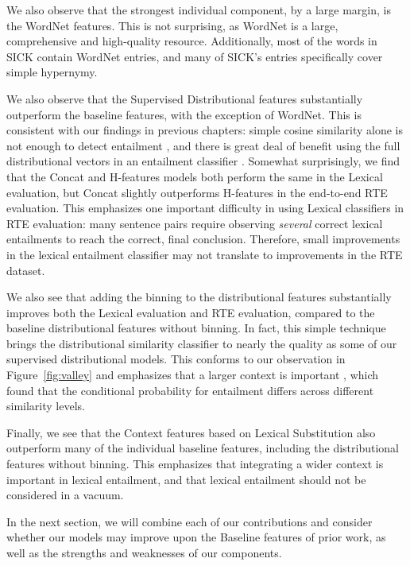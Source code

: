 We also observe that the strongest individual component, by a large margin, is
the WordNet features. This is not surprising, as WordNet is a large,
comprehensive and high-quality resource. Additionally, most of the words in SICK
contain WordNet entries, and many of SICK's entries specifically cover
simple hypernymy.

We also observe that the Supervised Distributional features substantially
outperform the baseline features, with the exception of WordNet. This is
consistent with our findings in previous chapters: simple cosine similarity
alone is not enough to detect entailment
\cite{weeds:2004:coling,baroni:2012:eacl,lenci:2012:starsem}, and there is
great deal of benefit using the full distributional vectors in an entailment
classifier
\cite{roller:2014:coling,kruszewski:2015:tacl,roller:2016:emnlp,shwartz:2016:acl}.
Somewhat surprisingly, we find that the Concat and H-features models both
perform the same in the Lexical evaluation, but Concat slightly outperforms
H-features in the end-to-end RTE evaluation. This emphasizes one important
difficulty in using Lexical classifiers in RTE evaluation: many sentence pairs
require observing {\em several} correct lexical entailments to reach the
correct, final conclusion. Therefore, small improvements in the lexical
entailment classifier may not translate to improvements in the RTE dataset.

We also see that adding the binning to the distributional features
substantially improves both the Lexical evaluation and RTE evaluation, compared
to the baseline distributional features without binning. In fact, this simple
technique brings the distributional similarity classifier to nearly the quality
as some of our supervised distributional models. This conforms to our
observation in Figure~\ref{fig:valley} and emphasizes that a larger context
is important , which found that the conditional
probability for entailment differs across different similarity levels.

Finally, we see that the Context features based on Lexical Substitution
also outperform many of the individual baseline features, including
the distributional features without binning. This emphasizes that integrating
a wider context is important in lexical entailment, and that lexical
entailment should not be considered in a vacuum.

In the next section, we will combine each of our contributions and consider
whether our models may improve upon the Baseline features of prior work,
as well as the strengths and weaknesses of our components.

